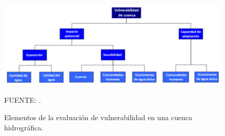 \begin{figure}
	\includegraphics[scale=0.8]{Images/Nelitz01.png}
	\centering
	\caption{Elementos de la evaluación de vulnerabilidad en una cuenca hidrográfica.}
	
	{\raggedright FUENTE: \citet{nelitz2013tools}. \par}

	
    \label{fig:Nelitz01}
    
\end{figure}
